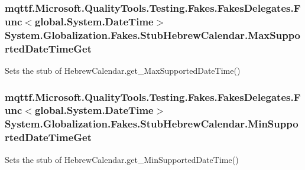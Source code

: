 \hypertarget{class_system_1_1_globalization_1_1_fakes_1_1_stub_hebrew_calendar_a92b846f4e7dcee582377b3e4fa7ae540}{
\subsubsection[{Max\-Supported\-Date\-Time\-Get}]{\setlength{\rightskip}{0pt plus 5cm}mqttf.\-Microsoft.\-Quality\-Tools.\-Testing.\-Fakes.\-Fakes\-Delegates.\-Func$<$global.\-System.\-Date\-Time$>$ System.\-Globalization.\-Fakes.\-Stub\-Hebrew\-Calendar.\-Max\-Supported\-Date\-Time\-Get}}\label{class_system_1_1_globalization_1_1_fakes_1_1_stub_hebrew_calendar_a92b846f4e7dcee582377b3e4fa7ae540}


Sets the stub of Hebrew\-Calendar.\-get\-\_\-\-Max\-Supported\-Date\-Time()

\hypertarget{class_system_1_1_globalization_1_1_fakes_1_1_stub_hebrew_calendar_a16bbb52cba3d29349bf7439cf97898e5}{
\subsubsection[{Min\-Supported\-Date\-Time\-Get}]{\setlength{\rightskip}{0pt plus 5cm}mqttf.\-Microsoft.\-Quality\-Tools.\-Testing.\-Fakes.\-Fakes\-Delegates.\-Func$<$global.\-System.\-Date\-Time$>$ System.\-Globalization.\-Fakes.\-Stub\-Hebrew\-Calendar.\-Min\-Supported\-Date\-Time\-Get}}\label{class_system_1_1_globalization_1_1_fakes_1_1_stub_hebrew_calendar_a16bbb52cba3d29349bf7439cf97898e5}


Sets the stub of Hebrew\-Calendar.\-get\-\_\-\-Min\-Supported\-Date\-Time()

